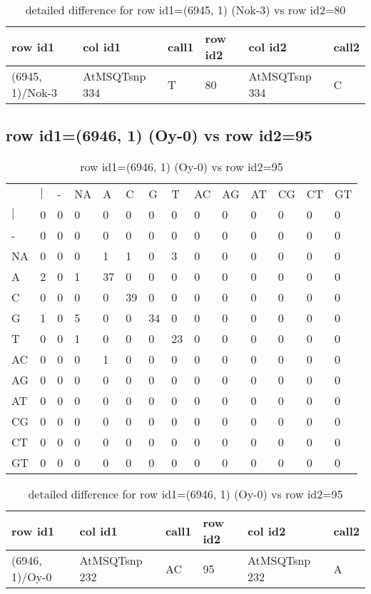 \begin{center}
\begin{longtable}{|l|l|l|l|l|l|}
\caption{detailed difference for row id1=(6945, 1) (Nok-3) vs row id2=80} \label{table_dm151}\\
\hline
row id1&col id1&call1&row id2&col id2&call2\\
\hline
(6945, 1)/Nok-3&AtMSQTsnp 334&T&80&AtMSQTsnp 334&C\\
\hline
\end{longtable}
\end{center}

\subsection{row id1=(6946, 1) (Oy-0) vs row id2=95}
\begin{center}
\begin{longtable}{|l|l|l|l|l|l|l|l|l|l|l|l|l|l|}
\caption{row id1=(6946, 1) (Oy-0) vs row id2=95} \label{table_dm152}\\
\hline
\\
\hline
&$|$&-&NA&A&C&G&T&AC&AG&AT&CG&CT&GT\\
$|$&0&0&0&0&0&0&0&0&0&0&0&0&0\\
-&0&0&0&0&0&0&0&0&0&0&0&0&0\\
NA&0&0&0&1&1&0&3&0&0&0&0&0&0\\
A&2&0&1&37&0&0&0&0&0&0&0&0&0\\
C&0&0&0&0&39&0&0&0&0&0&0&0&0\\
G&1&0&5&0&0&34&0&0&0&0&0&0&0\\
T&0&0&1&0&0&0&23&0&0&0&0&0&0\\
AC&0&0&0&1&0&0&0&0&0&0&0&0&0\\
AG&0&0&0&0&0&0&0&0&0&0&0&0&0\\
AT&0&0&0&0&0&0&0&0&0&0&0&0&0\\
CG&0&0&0&0&0&0&0&0&0&0&0&0&0\\
CT&0&0&0&0&0&0&0&0&0&0&0&0&0\\
GT&0&0&0&0&0&0&0&0&0&0&0&0&0\\
\hline
\end{longtable}
\end{center}

\begin{center}
\begin{longtable}{|l|l|l|l|l|l|}
\caption{detailed difference for row id1=(6946, 1) (Oy-0) vs row id2=95} \label{table_dm153}\\
\hline
row id1&col id1&call1&row id2&col id2&call2\\
\hline
(6946, 1)/Oy-0&AtMSQTsnp 232&AC&95&AtMSQTsnp 232&A\\
\hline
\end{longtable}
\end{center}

